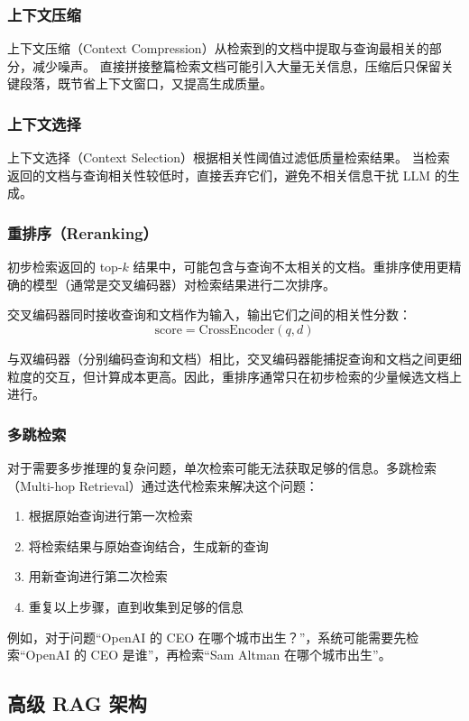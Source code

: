 \subsubsection{上下文压缩}
上下文压缩（Context Compression）从检索到的文档中提取与查询最相关的部分，减少噪声。
直接拼接整篇检索文档可能引入大量无关信息，压缩后只保留关键段落，既节省上下文窗口，又提高生成质量。

\subsubsection{上下文选择}
上下文选择（Context Selection）根据相关性阈值过滤低质量检索结果。
当检索返回的文档与查询相关性较低时，直接丢弃它们，避免不相关信息干扰 LLM 的生成。

\subsubsection{重排序（Reranking）}
初步检索返回的 top-$k$ 结果中，可能包含与查询不太相关的文档。重排序使用更精确的模型（通常是交叉编码器）对检索结果进行二次排序。

交叉编码器同时接收查询和文档作为输入，输出它们之间的相关性分数：
\begin{equation*}
	\text{score} = \text{CrossEncoder}(q, d)
\end{equation*}

与双编码器（分别编码查询和文档）相比，交叉编码器能捕捉查询和文档之间更细粒度的交互，但计算成本更高。因此，重排序通常只在初步检索的少量候选文档上进行。

\subsubsection{多跳检索}
对于需要多步推理的复杂问题，单次检索可能无法获取足够的信息。多跳检索（Multi-hop Retrieval）通过迭代检索来解决这个问题：
\begin{enumerate}
	\item 根据原始查询进行第一次检索
	\item 将检索结果与原始查询结合，生成新的查询
	\item 用新查询进行第二次检索
	\item 重复以上步骤，直到收集到足够的信息
\end{enumerate}

例如，对于问题“OpenAI 的 CEO 在哪个城市出生？”，系统可能需要先检索“OpenAI 的 CEO 是谁”，再检索“Sam Altman 在哪个城市出生”。

\subsection{高级 RAG 架构}
